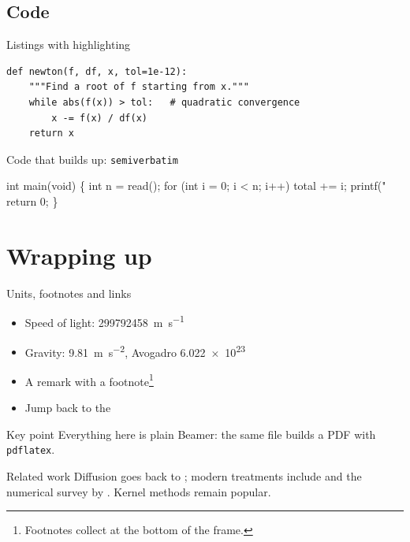 \documentclass[aspectratio=169,xcolor=table]{beamer}
\newenvironment{keypoint}{\begin{block}{Key point}}{\end{block}}
\begin{document}
\subsection{Code}

\begin{frame}[fragile]{Listings with highlighting}
\begin{lstlisting}[caption={Newton's method}]
def newton(f, df, x, tol=1e-12):
    """Find a root of f starting from x."""
    while abs(f(x)) > tol:   # quadratic convergence
        x -= f(x) / df(x)
    return x
\end{lstlisting}
\end{frame}

\begin{frame}[fragile]{Code that builds up: \texttt{semiverbatim}}
\begin{semiverbatim}
int main(void) \{
    int n = read();
\pause
    for (int i = 0; i < n; i++)
        \alert<2>{total += i;}
\pause
    printf("%
    return 0;
\}
\end{semiverbatim}
\end{frame}

\section{Wrapping up}

\begin{frame}{Units, footnotes and links}
  \begin{itemize}
    \item Speed of light: \SI{299792458}{\meter\per\second}
    \item Gravity: \qty{9.81}{\meter\per\second\squared}, Avogadro \num{6.022e23}
    \item A remark with a footnote\footnote{Footnotes collect at the bottom of the frame.}
    \item Jump back to the \hyperlink{overlays}{}
  \end{itemize}
  \vfill
  \begin{keypoint}
    Everything here is plain Beamer: the same file builds a PDF with \texttt{pdflatex}.
  \end{keypoint}
\end{frame}

\begin{frame}{Related work}
  Diffusion goes back to \citet{fourier1822}; modern treatments include
  \citet{evans2010} and the numerical survey by \citet{leveque2007}.
  Kernel methods \citep[see][ch.~2]{evans2010} remain popular.
\end{frame}
\end{document}
